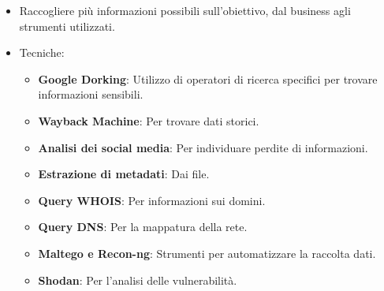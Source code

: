 \documentclass[12pt]{article}
\begin{document}
\begin{enumerate}
\begin{enumerate}
        \begin{itemize}
            \item Raccogliere pi\`{u} informazioni possibili sull'obiettivo, 
            dal business agli strumenti utilizzati.
            \item Tecniche:
            \begin{itemize}
                \item \textbf{Google Dorking}: Utilizzo di operatori di ricerca 
                specifici per trovare informazioni sensibili.
                \item \textbf{Wayback Machine}: Per trovare dati storici.
                \item \textbf{Analisi dei social media}: Per individuare perdite 
                di informazioni.
                \item \textbf{Estrazione di metadati}: Dai file.
                \item \textbf{Query WHOIS}: Per informazioni sui domini.
                \item \textbf{Query DNS}: Per la mappatura della rete.
                \item \textbf{Maltego e Recon-ng}: Strumenti per automatizzare 
                la raccolta dati.
                \item \textbf{Shodan}: Per l'analisi delle vulnerabilit\`{a}.
            \end{itemize} 
        \end{itemize}
        

\end{enumerate}
\end{enumerate}
\end{document}
